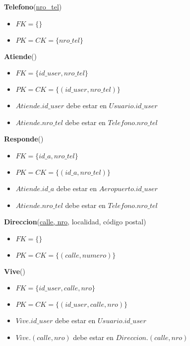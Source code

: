 \noindent
\textbf{Telefono}(\underline{nro\_tel})
\begin{itemize}[noitemsep]
    \item $FK = \{\}$
    \item $PK = CK = \{nro\_tel\}$    
\end{itemize}

\vspace*{0.1cm}
\noindent
\textbf{Atiende}(\underline{})
\begin{itemize}[noitemsep]
	\item $FK = \{id\_user, nro\_tel\}$
	\item $PK = CK = \{(id\_user, nro\_tel)\}$
	\item $Atiende.id\_user$ debe estar en $Usuario.id\_user$
	\item $Atiende.nro\_tel$ debe estar en $Telefono.nro\_tel$
\end{itemize}

\newpage
\vspace*{0.1cm}
\noindent
\textbf{Responde}(\underline{})
\begin{itemize}[noitemsep]
    \item $FK = \{id\_a, nro\_tel\}$
    \item $PK = CK = \{(id\_a, nro\_tel)\}$
    \item $Atiende.id\_a$ debe estar en $Aeropuerto.id\_user$
    \item $Atiende.nro\_tel$ debe estar en $Telefono.nro\_tel$
\end{itemize}


\vspace*{0.1cm}
\noindent
\textbf{Direccion}(\underline{calle, nro}, 
                    localidad, código postal)
\begin{itemize}[noitemsep]
    \item $FK = \{\}$
    \item $PK = CK = \{(calle, numero)\}$    
\end{itemize}


\vspace*{0.1cm}
\noindent
\textbf{Vive}(\underline{})
\begin{itemize}[noitemsep]
    \item $FK = \{id\_user, calle, nro\}$
    \item $PK = CK = \{(id\_user, calle, nro)\}$
    \item $Vive.id\_user$ debe estar en $Usuario.id\_user$
    \item $Vive.(calle, nro)$ debe estar en $Direccion.(calle, nro)$
\end{itemize}

